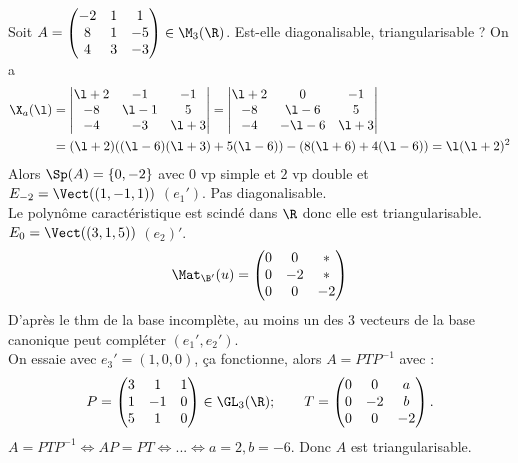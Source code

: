 \documentclass[11pt]{article}
\begin{document}
\begin{exercice}{}{}
    Soit $A=\begin{pmatrix}-2&1&1\\8&1&-5\\4&3&-3\end{pmatrix}\in\M_3(\R)$. Est-elle diagonalisable, triangularisable ?
    \tcblower
    On a
    \begin{align*}
        \X_a(\l) &= \begin{vmatrix}\l+2&-1&-1\\-8&\l-1&5\\-4&-3&\l+3\end{vmatrix} = \begin{vmatrix}\l+2&0&-1\\-8&\l-6&5\\-4&-\l-6&\l+3\end{vmatrix}\\ &=(\l+2)((\l-6)(\l+3)+5(\l-6)) - (8(\l+6) + 4(\l-6)) = \l(\l+2)^2
    \end{align*}
    Alors $\Sp(A)=\{0,-2\}$ avec $0$ vp simple et $2$ vp double et $E_{-2}=\Vect((1,-1,1))$ $(e_1')$. Pas diagonalisable.\\
    Le polynôme caractéristique est scindé dans $\R$ donc elle est triangularisable. $E_0=\Vect((3,1,5))$  $(e_2)'$.
    \begin{equation*}
        \Mat_{\B'}(u) = \begin{pmatrix}0&0&*\\0&-2&*\\0&0&-2\end{pmatrix}
    \end{equation*}
    D'après le thm de la base incomplète, au moins un des 3 vecteurs de la base canonique peut compléter $(e_1',e_2')$.\\
    On essaie avec $e_3'=(1,0,0)$, ça fonctionne, alors $A=PTP^{-1}$ avec :
    \begin{equation*}
        P = \begin{pmatrix}3&1&1\\1&-1&0\\5&1&0\end{pmatrix} \in \GL_3(\R); \qquad T=\begin{pmatrix}0&0&a\\0&-2&b\\0&0&-2\end{pmatrix}.
    \end{equation*}
    $A=PTP^{-1}\iff AP=PT \iff ... \iff a=2, b=-6$. Donc $A$ est triangularisable.
\end{exercice}
\end{document}
